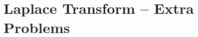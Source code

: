 \documentclass[letterpaper, fontsize=12pt]{scrartcl} %
\numberwithin{equation}{section} %
\numberwithin{figure}{section} %
\numberwithin{table}{section} %
\begin{document}

\newcommand{\horrule}[1]{\rule{\linewidth}{#1}} %


\section*{Laplace Transform -- Extra Problems}
\end{document}
